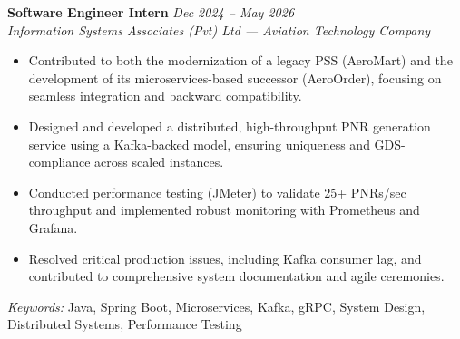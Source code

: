 \textbf{Software Engineer Intern} \hfill \textit{Dec 2024 – May 2026} \\
\textit{Information Systems Associates (Pvt) Ltd — Aviation Technology Company}

\begin{itemize}[leftmargin=*]
    \item Contributed to both the modernization of a legacy PSS (AeroMart) and the development of its microservices-based successor (AeroOrder), focusing on seamless integration and backward compatibility.
    \item Designed and developed a distributed, high-throughput PNR generation service using a Kafka-backed model, ensuring uniqueness and GDS-compliance across scaled instances.
    \item Conducted performance testing (JMeter) to validate 25+ PNRs/sec throughput and implemented robust monitoring with Prometheus and Grafana.
    \item Resolved critical production issues, including Kafka consumer lag, and contributed to comprehensive system documentation and agile ceremonies.
\end{itemize}

\textit{Keywords:} Java, Spring Boot, Microservices, Kafka, gRPC, System Design, Distributed Systems, Performance Testing
